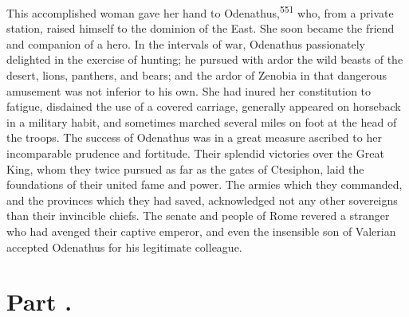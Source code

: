 


This accomplished woman gave her hand to Odenathus,\textsuperscript{551} who, from
a private station, raised himself to the dominion of the East.
She soon became the friend and companion of a hero. In the
intervals of war, Odenathus passionately delighted in the
exercise of hunting; he pursued with ardor the wild beasts of the
desert, lions, panthers, and bears; and the ardor of Zenobia in
that dangerous amusement was not inferior to his own. She had
inured her constitution to fatigue, disdained the use of a
covered carriage, generally appeared on horseback in a military
habit, and sometimes marched several miles on foot at the head of
the troops. The success of Odenathus was in a great measure
ascribed to her incomparable prudence and fortitude. Their
splendid victories over the Great King, whom they twice pursued
as far as the gates of Ctesiphon, laid the foundations of their
united fame and power. The armies which they commanded, and the
provinces which they had saved, acknowledged not any other
sovereigns than their invincible chiefs. The senate and people of
Rome revered a stranger who had avenged their captive emperor,
and even the insensible son of Valerian accepted Odenathus for
his legitimate colleague.


\section{Part \thesection.}

